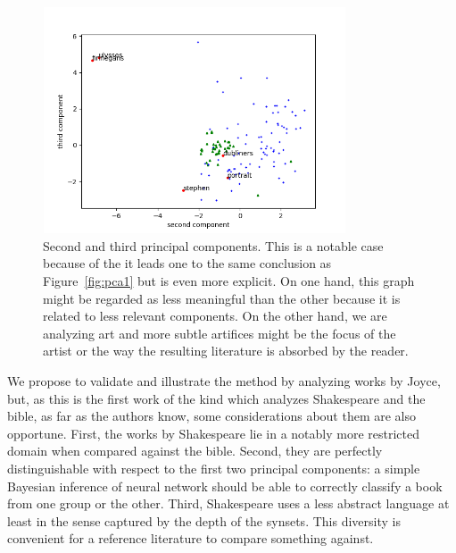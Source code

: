 \documentclass[12pt,fleqn]{article}
\begin{document}
\begin{figure}[!htbp] %
\vspace{-2pt}
\begin{center}
\includegraphics[height=6.7cm,width=9cm]{figs/pca3}%
\caption{Second and third principal components.
    This is a notable case because of the it leads one to the
    same conclusion as Figure~\ref{fig:pca1} but is even more explicit.
    On one hand, this graph might be regarded as less meaningful than the other because it is related to less relevant components.
    On the other hand, we are analyzing art and more subtle artifices might be the focus of the artist or the way the resulting literature is absorbed by the reader.}
\label{fig:pca3}%
\end{center}
\end{figure}

We propose to validate and illustrate the method by analyzing
works by Joyce, but, as this is the first work of the kind which analyzes
Shakespeare and the bible, as far as the authors know,
some considerations about them are also opportune.
First, the works by Shakespeare lie in a notably more restricted domain
when compared against the bible.
Second, they are perfectly distinguishable with respect to the first two
principal components: a simple Bayesian inference of neural network
should be able to correctly classify a book from one group or the other.
Third, Shakespeare uses a less abstract language at least in the sense captured
by the depth of the synsets.
This diversity is convenient for a reference literature to compare something against.
\end{document}
